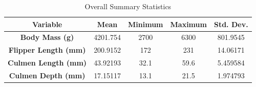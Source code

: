 \documentclass[12pt]{article}
\begin{document}
  \begin{table}[H]
    \centering
    \begin{tabular}{|| c | c | c | c | c ||}
      \hline
      \textbf{Variable} & \textbf{Mean}
      & \textbf{Minimum}
      & \textbf{Maximum} & \textbf{Std. Dev.} \\[0.5ex]
      \hline\hline
      \textbf{Body Mass (g)} & 4201.754 & 2700 & 6300 & 801.9545 \\
      \textbf{Flipper Length (mm)} & 200.9152 & 172 & 231 & 14.06171 \\
      \textbf{Culmen Length (mm)} & 43.92193 & 32.1 & 59.6 & 5.459584 \\
      \textbf{Culmen Depth (mm)} & 17.15117 & 13.1 & 21.5 & 1.974793 \\
      \hline
    \end{tabular}
    \caption{Overall Summary Statistics}
  \end{table}
\end{document}
